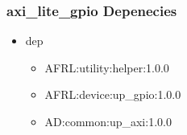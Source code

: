 \subsubsection{axi\_lite\_gpio Depenecies}
\begin{itemize}
\item dep
	\begin{itemize}
	\item AFRL:utility:helper:1.0.0
	\item AFRL:device:up\_gpio:1.0.0
	\item AD:common:up\_axi:1.0.0
	\end{itemize}
\end{itemize}
